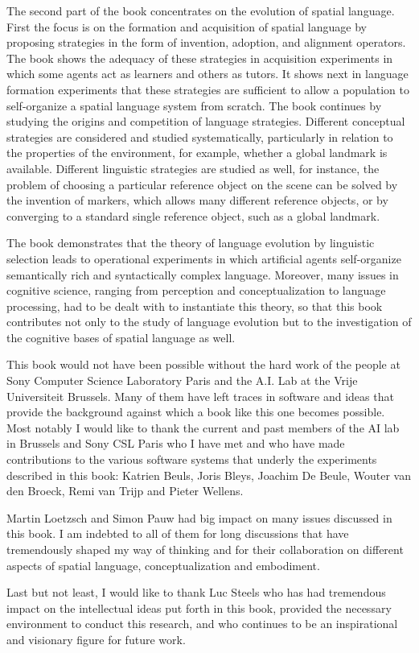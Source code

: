 The second part of the book concentrates on the evolution of spatial language.
First the focus is on the formation and acquisition of 
spatial language by proposing strategies in the form of invention, adoption, 
and alignment operators. The book shows the adequacy of these strategies 
in acquisition experiments in which some agents act as learners
and others as tutors. It shows next in language formation experiments
that these strategies are sufficient to allow a population to self-organize 
a spatial language system from scratch.
The book continues by studying the origins and competition of 
language strategies. Different conceptual strategies are considered and studied 
systematically, particularly in relation to
the properties of the environment, for example, whether a global landmark is available.
Different linguistic strategies are studied as well,
for instance, the problem of choosing a particular reference object on the scene can be solved
by the invention of markers, which allows many different reference objects, or by converging
to a standard single reference object, such as a global landmark.

The book demonstrates that the theory of language evolution 
by linguistic selection leads to operational experiments in which artificial agents 
self-organize semantically rich and syntactically complex language. Moreover, 
many issues in cognitive science, ranging from perception and conceptualization to
language processing, had to be dealt with to instantiate this theory, so that this book 
contributes not only to the study of language evolution but to the investigation 
of the cognitive bases of spatial language as well.

This book would not have been possible without the hard work of
the people at Sony Computer Science Laboratory Paris and the A.I. Lab at 
the Vrije Universiteit Brussels. Many of them have left traces in software and 
ideas that provide the background against which a book like this one becomes 
possible. Most notably I would like to thank the current and past members
of the AI lab in Brussels and Sony CSL Paris who I have met
and who have made contributions to the various software systems that underly the 
experiments described in this book: Katrien Beuls, Joris Bleys,
Joachim De Beule, Wouter van den Broeck, Remi van Trijp and Pieter Wellens. 

Martin Loetzsch and Simon Pauw had big impact on many issues discussed in this book. 
I am indebted to all of them for long discussions that have tremendously shaped my way of thinking 
and for their collaboration on different aspects of spatial language, conceptualization and embodiment.

Last but not least, I would like to thank Luc Steels who has had tremendous impact
on the intellectual ideas put forth in this book, provided the necessary environment 
to conduct this research, and who continues to be an inspirational and visionary figure
for future work.